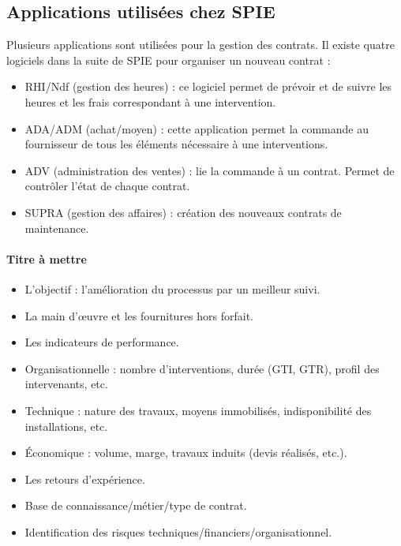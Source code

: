 
\subsection{Applications utilisées chez SPIE}

Plusieurs applications sont utilisées pour la gestion des contrats. Il existe quatre logiciels dans la suite de SPIE pour organiser un nouveau contrat :

\begin{itemize}
\item RHI/Ndf (gestion des heures) : ce logiciel permet de prévoir et de suivre les heures et les frais correspondant à une intervention.
\item ADA/ADM (achat/moyen) : cette application permet la commande au fournisseur de tous les éléments nécessaire à une interventions.
\item ADV (administration des ventes) : lie la commande à un contrat. Permet de contrôler l’état de chaque contrat.
\item SUPRA (gestion des affaires) : création des nouveaux contrats de maintenance.
\end{itemize}

\paragraph{Titre à mettre}

\begin{itemize}
\item L’objectif : l’amélioration du processus par un meilleur suivi.
\item La main d’œuvre et les fournitures hors forfait.
\item Les indicateurs de performance.
\item Organisationnelle : nombre d’interventions, durée (GTI, GTR), profil des intervenants, etc.
\item Technique : nature des travaux, moyens immobilisés, indisponibilité des installations, etc.
\item Économique : volume, marge, travaux induits (devis réalisés, etc.).
\item Les retours d’expérience.
\item Base de connaissance/métier/type de contrat.
\item Identification des risques techniques/financiers/organisationnel.
\end{itemize}

